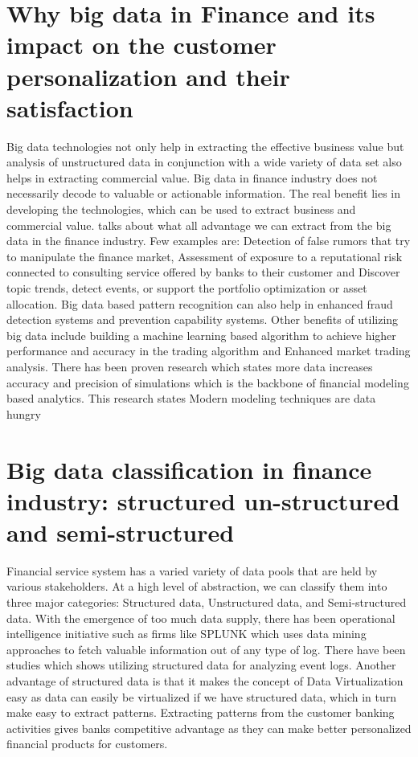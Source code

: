 \documentclass[sigconf]{acmart}
\begin{document}
\section{Why big data in Finance and its impact on the customer personalization and their satisfaction}

Big data technologies not only help in extracting the effective business value but analysis of unstructured data in conjunction with a wide variety of data set also helps in extracting commercial value. Big data in finance industry does not necessarily decode to valuable or actionable information. The real benefit lies in developing the technologies, which can be used to extract business and commercial value.  \cite{Ref4}  talks about what all advantage we can extract from the big data in the finance industry. Few examples are: Detection of false rumors that try to manipulate the finance market, Assessment of exposure to a reputational risk connected to consulting service offered by banks to their customer and Discover topic trends, detect events, or support the portfolio optimization or asset allocation.  Big data based pattern recognition can also help in enhanced fraud detection systems and prevention capability systems. Other benefits of utilizing big data include building a machine learning based algorithm to achieve higher performance and accuracy in the trading algorithm and Enhanced market trading analysis. There has been proven research \cite{Ref7} which states more data increases accuracy and precision of simulations which is the backbone of financial modeling based analytics. This research \cite{Ref7} states Modern modeling techniques are data hungry 

\section{Big data classification in finance industry: structured un-structured and semi-structured }

Financial service system has a varied variety of data pools that are held by various stakeholders. At a high level of abstraction, we can classify them into three major categories: Structured data, Unstructured data, and Semi-structured data. With the emergence of too much data supply, there has been operational intelligence initiative such as firms like SPLUNK which uses data mining approaches to fetch valuable information out of any type of log. There have been studies \cite{Ref6} which shows utilizing structured data for analyzing event logs. Another advantage of structured data is that it makes the concept of Data Virtualization easy as data can easily be virtualized if we have structured data, which in turn make easy to extract patterns. Extracting patterns from the customer banking activities gives banks competitive advantage as they can make better personalized financial products for customers. 
\end{document}
